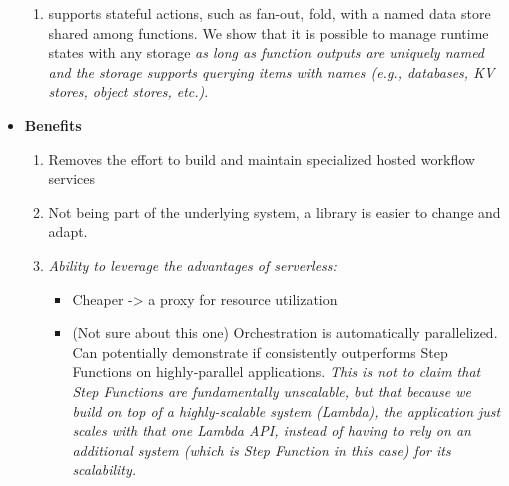 \begin{itemize}
\begin{enumerate}
      \item \name{} supports stateful actions, such as fan-out, fold, with a
      named data store shared among functions.  We show that it is possible to
      manage runtime states with any storage \emph{as long as function outputs
      are uniquely named and the storage supports querying items with names
      (e.g., databases, KV stores, object stores, etc.)}.
    \end{enumerate}

  \item \textbf{Benefits}
    \begin{enumerate}
      \item Removes the effort to build and maintain specialized hosted
      workflow services
      \item Not being part of the underlying system, a library is easier to
      change and adapt.
      \item \emph{Ability to leverage the advantages of serverless:}
        \begin{itemize}
          \item Cheaper -> a proxy for resource utilization
          \item (Not sure about this one) Orchestration is automatically
          parallelized. Can potentially demonstrate if \name{} consistently
          outperforms Step Functions on highly-parallel applications.
          \emph{This is not to claim that Step Functions are fundamentally
          unscalable, but that because we build on top of a highly-scalable
          system (Lambda), the application just scales with that one Lambda
          API, instead of having to rely on an additional system (which is
          Step Function in this case) for its scalability.}
        \end{itemize}
    \end{enumerate}





\end{itemize}
